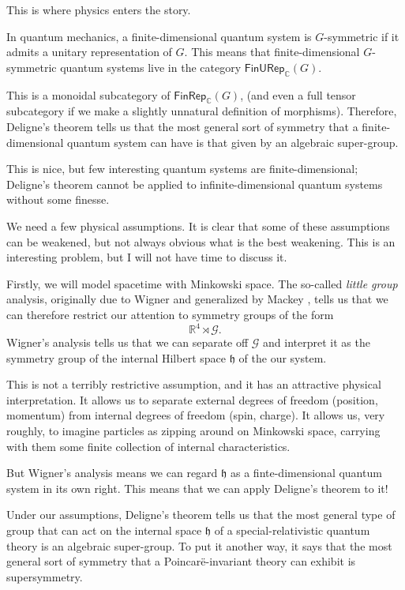 \documentclass[a4paper,10pt]{scrreprt}
\newcommand{\R}{\mathbb{R}}
\newcommand{\C}{\mathbb{C}}
\theoremstyle{definition}
\theoremstyle{plain}
\theoremstyle{remark}
\begin{document}
This is where physics enters the story.

In quantum mechanics, a finite-dimensional quantum system is $G$-symmetric if it admits a unitary representation of $G$. This means that finite-dimensional $G$-symmetric quantum systems live in the category $\mathsf{FinURep}_{\C}(G)$.

This is a monoidal subcategory of $\mathsf{FinRep}_{\C}(G)$, (and even a full tensor subcategory if we make a slightly unnatural definition of morphisms). Therefore, Deligne's theorem tells us that the most general sort of symmetry that a finite-dimensional quantum system can have is that given by an algebraic super-group.

This is nice, but few interesting quantum systems are finite-dimensional; Deligne's theorem cannot be applied to infinite-dimensional quantum systems without some finesse.

We need a few physical assumptions. It is clear that some of these assumptions can be weakened, but not always obvious what is the best weakening. This is an interesting problem, but I will not have time to discuss it.

Firstly, we will model spacetime with Minkowski space. The so-called \emph{little group} analysis, originally due to Wigner \cite{wigner-little-group} and generalized by Mackey \cite{mackey-induced-representations}, tells us that we can therefore restrict our attention to symmetry groups of the form 
\begin{equation*}
  \R^{4} \rtimes \mathcal{G}.
\end{equation*}
Wigner's analysis tells us that we can separate off $\mathcal{G}$ and interpret it as the symmetry group of the internal Hilbert space $\mathfrak{h}$ of the our system.

This is not a terribly restrictive assumption, and it has an attractive physical interpretation. It allows us to separate external degrees of freedom (position, momentum) from internal degrees of freedom (spin, charge). It allows us, very roughly, to imagine particles as zipping around on Minkowski space, carrying with them some finite collection of internal characteristics.

But Wigner's analysis means we can regard $\mathfrak{h}$ as a finte-dimensional quantum system in its own right. This means that we can apply Deligne's theorem to it! 

Under our assumptions, Deligne's theorem tells us that the most general type of group that can act on the internal space $\mathfrak{h}$ of a special-relativistic quantum theory is an algebraic super-group. To put it another way, it says that the most general sort of symmetry that a Poincar\"{e}-invariant theory can exhibit is supersymmetry.
\end{document}
